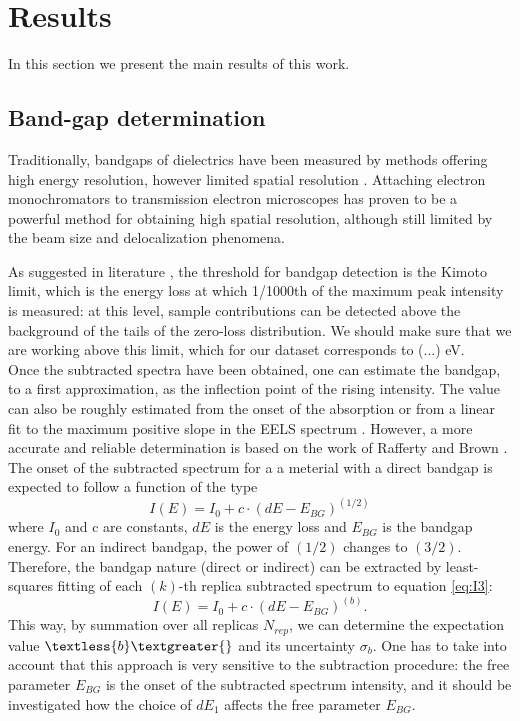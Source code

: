 \section{Results}
\label{sec:results}

In this section we present the main results of this work.


\subsection{Band-gap determination}
Traditionally, bandgaps of dielectrics have been measured by methods offering high energy resolution, however limited spatial resolution \cite{Park:2008}. Attaching electron monochromators to transmission electron microscopes has proven to be a powerful method for obtaining high spatial resolution, although still limited by the beam size and delocalization phenomena. 

As suggested in literature \cite{15,14}, the threshold for bandgap detection is the Kimoto limit, which is the energy loss at which 1/1000th of the maximum peak intensity is measured: at this level, sample contributions can be detected above the background of the tails of the zero-loss distribution. We should make sure that we are working above this limit, which for our dataset corresponds to (...) eV.\\

Once the subtracted spectra have been obtained, one can estimate the bandgap, to a first approximation, as the inflection point of the rising intensity. The value can also be roughly estimated from the onset of the absorption or from a linear fit to the maximum positive slope in the EELS spectrum \cite{Schamm:2003}. However, a more accurate and reliable determination is based on the work of Rafferty and Brown  \cite{Rafferty:2000}. The onset of the subtracted spectrum for a a meterial with a direct bandgap is expected to follow a function of the type
\begin{equation} \label{eq:I1}
    I(E) = I_0 + c\cdot(dE-E_{BG})^{(1/2)}
\end{equation}
where $I_0$ and c are constants, $dE$ is the energy loss and $E_{BG}$ is the bandgap energy. For an indirect bandgap, the power of $(1/2)$ changes to $(3/2)$. Therefore, the bandgap nature (direct or indirect) can be extracted by least-squares fitting of each $(k)$-th replica subtracted spectrum to equation \ref{eq:I3}:
\begin{equation} \label{eq:I3}
    I(E) = I_0 + c\cdot(dE-E_{BG})^{(b)}.
\end{equation}
This way, by summation over all replicas $N_{rep}$, we can determine the expectation value $\textless{b}\textgreater{}$ and its uncertainty $\sigma_b$. One has to take into account that this approach is very sensitive to the subtraction procedure: the free parameter $E_{BG}$ is the onset of the subtracted spectrum intensity, and it should be investigated how the choice of $dE_1$ affects the free parameter $E_{BG}$.
